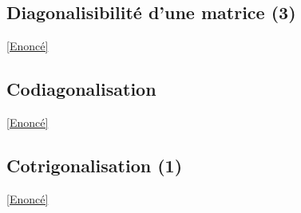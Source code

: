 \documentclass[8pt]{book}
\begin{document}
	\subsection{Diagonalisibilité d'une matrice (3)}
	\label{Diagonalisabilité d'une matrice (3) corrigé}
	\textcolor{blue}{\hyperref[Diagonalisabité d'une matrice (3)]{[Enoncé]}}\\
	
	\subsection{Codiagonalisation }
	\label{Codiagonalisation corrigé}
	\textcolor{blue}{\hyperref[Codiagonalisation]{[Enoncé]}}\\
	
	\subsection{Cotrigonalisation (1) }
	\label{Cotrigonalisation (1) corrigé}
	\textcolor{blue}{\hyperref[Cotrigonalisation (1)]{[Enoncé]}}\\
	
\end{document}

